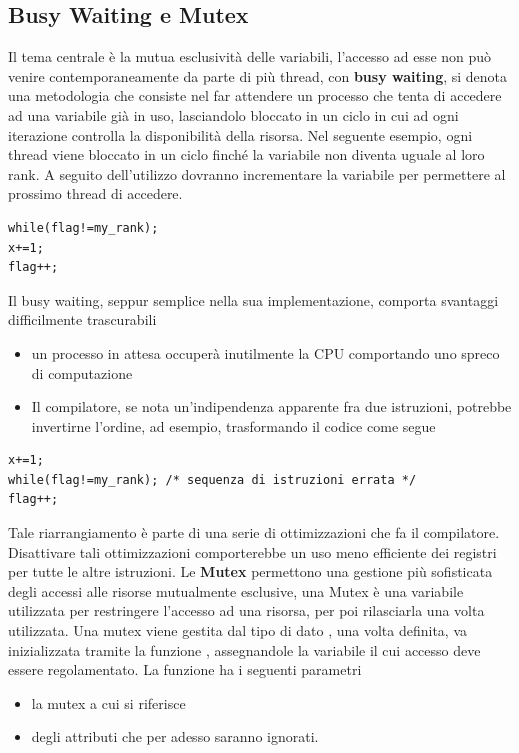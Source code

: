 \documentclass[10pt, letterpaper]{report}
\begin{document}
\subsection{Busy Waiting e Mutex}
Il tema centrale è la mutua esclusività delle variabili, l'accesso ad esse non può venire contemporaneamente da parte 
di più thread, con \textbf{busy waiting}, si denota una metodologia che consiste nel far attendere un processo che tenta 
di accedere ad una variabile già in uso, lasciandolo bloccato in un ciclo in cui ad ogni iterazione 
controlla la disponibilità della risorsa.\acc 
Nel seguente esempio, ogni thread viene bloccato in un ciclo finché la variabile  non 
diventa uguale al loro rank. A seguito dell'utilizzo dovranno incrementare la variabile per permettere 
al prossimo thread di accedere.
\begin{lstlisting}[style=CStyle]
while(flag!=my_rank);
x+=1;
flag++;
\end{lstlisting}
Il busy waiting, seppur semplice nella sua implementazione, comporta svantaggi difficilmente trascurabili\begin{itemize}
    \item un processo in attesa occuperà inutilmente la CPU comportando uno spreco di computazione 
    \item Il compilatore, se nota un'indipendenza apparente fra due istruzioni, potrebbe invertirne l'ordine, ad esempio, 
    trasformando il codice come segue
\end{itemize}
\begin{lstlisting}[style=CStyle]
x+=1;
while(flag!=my_rank); /* sequenza di istruzioni errata */
flag++;
\end{lstlisting}
Tale riarrangiamento è parte di una serie di ottimizzazioni che fa il compilatore. Disattivare tali ottimizzazioni 
comporterebbe un uso meno efficiente dei registri per tutte le altre istruzioni.\acc 
Le \textbf{Mutex} permettono una gestione più sofisticata degli accessi alle risorse mutualmente 
esclusive, una Mutex è una variabile utilizzata per restringere l'accesso ad una risorsa, per poi 
rilasciarla una volta utilizzata.\acc 
Una mutex viene gestita dal tipo di dato , una volta definita, va inizializzata 
tramite la funzione , 
assegnandole la variabile il cui accesso deve essere regolamentato. La funzione ha i seguenti 
parametri\begin{itemize}
    \item {} la mutex a cui si riferisce 
    \item {} degli attributi che per adesso saranno ignorati.
\end{itemize}
\end{document}

